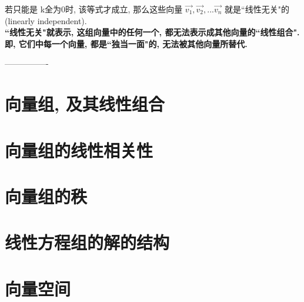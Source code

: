 \documentclass[UTF8]{ctexart}
\begin{document}
若只能是 k全为0时, 该等式才成立, 那么这些向量 $ \vec{v_1},  \vec{v_2}, ...  \vec{v_n}$ 就是``线性无关"的 (linearly independent). \\

\textbf{``线性无关"就表示, 这组向量中的任何一个, 都无法表示成其他向量的``线性组合". 即, 它们中每一个向量, 都是``独当一面"的, 无法被其他向量所替代.}




























----------------

\part{向量组, 及其线性组合}

\part{向量组的线性相关性}

\part{向量组的秩}

\part{线性方程组的解的结构}

\part{向量空间}
\end{document}
